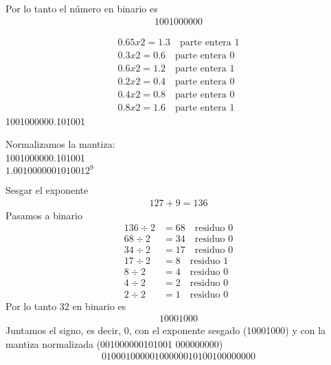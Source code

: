 \documentclass{article}
\begin{document}
\begin{enumerate}
    Por lo tanto el número en binario es
    \begin{align*}
        1001000000
    \end{align*}

    \begin{align*}
        0.65 x 2 = 1.3 \quad \text{parte entera } 1\\
        0.3 x 2 = 0.6 \quad \text{parte entera } 0\\
        0.6 x 2 = 1.2 \quad \text{parte entera } 1\\
        0.2 x 2 = 0.4 \quad \text{parte entera } 0 \\
        0.4 x 2 = 0.8 \quad \text{parte entera } 0 \\
        0.8 x 2 = 1.6 \quad \text{parte entera } 1
    \end{align*}
1001000000.101001
    
    Normalizamos la mantiza:\\
        1001000000.101001 \\
        $1.0010000001010012^{9}$
    
    Sesgar el exponente
    \begin{align*}
        127 + 9 = 136
    \end{align*}
    Pasamos a binario
    \begin{align*}
    136 \div 2 &= 68 \quad \text{residuo } 0 \\
    68 \div 2 &= 34 \quad \text{residuo } 0 \\
    34 \div 2 &= 17 \quad \text{residuo } 0 \\
    17 \div 2 &= 8 \quad \text{residuo } 1 \\
    8 \div 2 &= 4 \quad \text{residuo } 0 \\
    4 \div 2 &= 2 \quad \text{residuo } 0 \\
    2 \div 2 &= 1 \quad \text{residuo } 0 
    \end{align*}
    Por lo tanto 32 en binario es 
    \begin{align*}
        10001000
    \end{align*}
    Juntamos el signo, es decir, 0, con el exponente sesgado (10001000) y con la mantiza normalizada (001000000101001 000000000)
    \begin{align*}
        01000100000100000010100100000000
    \end{align*}


\end{enumerate}
\end{document}
